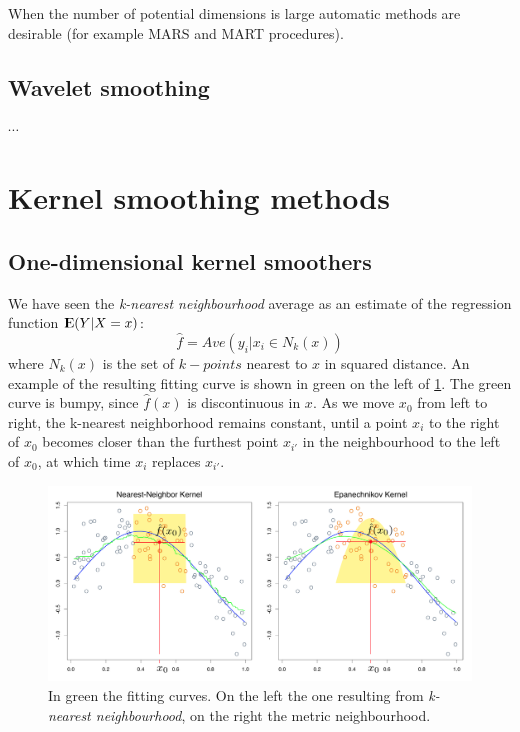 \documentclass[12pt, letterpaper]{article}
\theoremstyle{definition}
\newcommand{\E}{{\rm I\kern-.3em E}}
\begin{document}
When the number of potential dimensions is large automatic methods are desirable (for example MARS and MART procedures).
\subsection{Wavelet smoothing}
$\cdots$

\newpage
\section{Kernel smoothing methods}
\subsection{One-dimensional kernel smoothers}
We have seen the \textit{k-nearest neighbourhood} average as an estimate of the regression function $\E(Y|X=x)$:
\begin{equation}
\hat{f} = Ave(y_i|x_i\in N_k(x))
\end{equation}
where $N_k(x)$ is the set of $k-points$ nearest to $x$ in squared distance. An example of the resulting fitting curve is shown in green on the left of \ref{nearest}. The green curve is bumpy, since $\hat{f}(x)$ is discontinuous in $x$. As we move $x_0$ from left to right, the k-nearest neighborhood remains constant, until a point $x_i$ to the right of $x_0$ becomes closer than the furthest point $x_{i'}$ in the neighbourhood to the left of $x_0$, at which time $x_i$ replaces $x_{i'}$. 
\begin{figure}
\centering
\includegraphics[scale=0.38]{img/nearest}
\caption{In green the fitting curves. On the left the one resulting from \textit{k-nearest neighbourhood}, on the right the metric neighbourhood.}
\label{nearest}
\end{figure}
\end{document}
